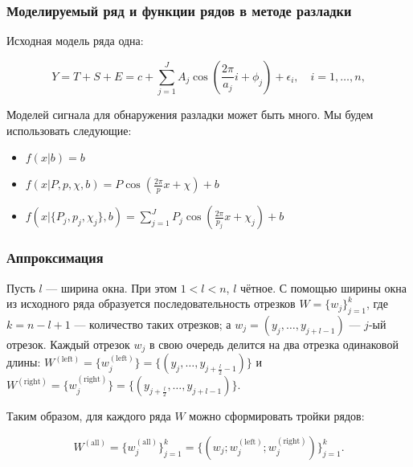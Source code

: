 \documentclass[intlimits, 9pt, unicode]{beamer}
\begin{document}
\begin{frame}
    \frametitle{Моделируемый ряд и функции рядов в методе разладки}

Исходная модель ряда одна:

\begin{equation*}
Y = T + S + E = c + \sum_{j=1}^{J}{A_j \cos \left( \frac{2\pi}{a_j} i + \phi_j \right)} + \epsilon_i, \quad i = 1, \dots, n, 
\end{equation*}



Моделей сигнала для обнаружения разладки может быть много. Мы будем использовать следующие:
\begin{itemize}
	\item $ f(x | b) = b $
	\item $f(x | P, p, \chi, b) = P\cos(\frac{2\pi}{p}x + \chi) + b$
	\item $f(x | \{P_j, p_j, \chi_j\}, b) = \sum_{j=1}^JP_j\cos(\frac{2\pi}{p_j}x + \chi_j) + b$
\end{itemize}

\end{frame}



\begin{frame}
    \frametitle{Аппроксимация}

Пусть $l$ --- ширина окна. При этом  $ 1 < l < n $, $l$ чётное. С помощью ширины окна из исходного ряда образуется последовательность отрезков $W = \{ w_j \}_{j=1}^k$, где $k = n - l + 1$ --- количество таких отрезков; а $ w_j = (y_j, \dots, y_{j+l-1}) $ --- $j$-ый отрезок. Каждый отрезок  $w_j$  в свою очередь делится на два отрезка одинаковой длины: $ W^{\mathrm{(left)}} = \{w_j^{\mathrm{(left)}} \}  =  \{(y_j, \dots, y_{j+\frac{l}{2}-1}) \}$ и $W^{\mathrm{(right)}} = \{w_j^{\mathrm{(right)}} \} = \{(y_{j+\frac{l}{2}}, \dots, y_{j+l-1}) \}$.

Таким образом, для каждого ряда $W$ можно сформировать тройки рядов: 

\begin{equation*}
W^{\mathrm{(all)}} = \{w_j^{\mathrm{(all)}} \}_{j=1}^k =  \{(w_j; w_j^{\mathrm{(left)}}; w_j^{\mathrm{(right)}}) \}_{j=1}^k. 
\end{equation*}

\end{frame}
\end{document}
